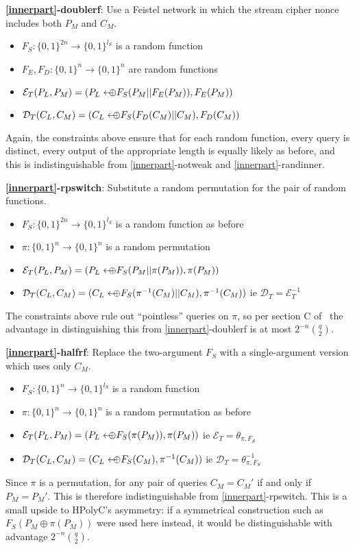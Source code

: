 \documentclass[letterpaper,luatex,11pt]{article}
\newcommand*{\arrowoplus}{\leftarrow\mkern-12mu\oplus}
\newcommand*{\xprm}[2]{\textsf{\ref*{#1}-#2}}
\newcommand*{\xprmtitle}[2]{\textbf{\xprm{#1}{#2}}}
\newcommand*{\calE}{\mathcal{E}}
\newcommand*{\calD}{\mathcal{D}}
\begin{document}
\xprmtitle{innerpart}{doublerf}: Use a Feistel network in which the stream cipher
nonce includes both $P_M$ and $C_M$.
\begin{itemize}
    \item $F_S: \{0,1\}^{2n} \rightarrow \{0,1\}^{l_S}$ is a random
    function
    \item $F_E, F_D: \{0,1\}^n \rightarrow \{0,1\}^n$ are random functions
    \item $\calE_T(P_L, P_M) = (P_L \arrowoplus F_S(P_M || F_E(P_M)), F_E(P_M))$
    \item $\calD_T(C_L, C_M) = (C_L \arrowoplus F_S(F_D(C_M) || C_M), F_D(C_M))$
\end{itemize}
Again, the constraints above ensure that for each random function,
every query is distinct,
every output of the appropriate length is equally
likely as before, and this is indistinguishable from
\xprm{innerpart}{notweak} and \xprm{innerpart}{randinner}.

\xprmtitle{innerpart}{rpswitch}: Substitute a random permutation for the pair of random functions.
\begin{itemize}
    \item $F_S: \{0,1\}^{2n} \rightarrow \{0,1\}^{l_S}$ is a random function as before
    \item $\pi: \{0,1\}^n \rightarrow \{0,1\}^n$ is a random permutation
    \item $\calE_T(P_L, P_M) = (P_L \arrowoplus F_S(P_M || \pi(P_M)), \pi(P_M))$
    \item $\calD_T(C_L, C_M) = (C_L \arrowoplus F_S(\pi^{-1}(C_M) || C_M), \pi^{-1}(C_M))$
    ie $\calD_T = \calE_T^{-1}$
\end{itemize}
The constraints above rule out ``pointless'' queries on $\pi$, so per section C of~\cite{cmc}
the advantage in distinguishing this from \xprm{innerpart}{doublerf} is at most
$2^{-n}\binom{q}{2}$.

\xprmtitle{innerpart}{halfrf}: Replace the two-argument $F_S$ with
a single-argument version which uses only $C_M$.
\begin{itemize}
    \item $F_S: \{0,1\}^n \rightarrow \{0,1\}^{l_S}$ is a random function
    \item $\pi: \{0,1\}^n \rightarrow \{0,1\}^n$ is a random permutation as before
    \item $\calE_T(P_L, P_M) = (P_L \arrowoplus F_S(\pi(P_M)), \pi(P_M))$
    ie $\calE_T = \theta_{\pi, F_S}$
    \item $\calD_T(C_L, C_M) = (C_L \arrowoplus F_S(C_M), \pi^{-1}(C_M))$
    ie $\calD_T = \theta_{\pi, F_S}^{-1}$
\end{itemize}
Since $\pi$ is a permutation,
for any pair of queries $C_M = C_M'$ if and only if $P_M = P_M'$.
This is therefore indistinguishable from \xprm{innerpart}{rpswitch}.
This is a small upside to HPolyC's asymmetry: if a symmetrical
construction such as $F_S(P_M \oplus \pi(P_M))$ were used here instead, it would be
distinguishable with advantage $2^{-n}\binom{q}{2}$.
\end{document}
